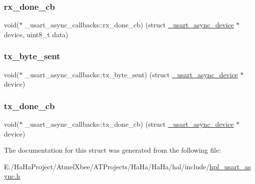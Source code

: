 \mbox{\label{struct__usart__async__callbacks_af3670aee54cc400737048dde5c64d30e}} 
\subsubsection{\texorpdfstring{rx\+\_\+done\+\_\+cb}{rx\_done\_cb}}
{\footnotesize\ttfamily void($\ast$ \+\_\+usart\+\_\+async\+\_\+callbacks\+::rx\+\_\+done\+\_\+cb) (struct \hyperlink{struct__usart__async__device}{\+\_\+usart\+\_\+async\+\_\+device} $\ast$device, uint8\+\_\+t data)}

\mbox{\label{struct__usart__async__callbacks_a8213240efd24edc2266b1d499b42e945}} 
\subsubsection{\texorpdfstring{tx\+\_\+byte\+\_\+sent}{tx\_byte\_sent}}
{\footnotesize\ttfamily void($\ast$ \+\_\+usart\+\_\+async\+\_\+callbacks\+::tx\+\_\+byte\+\_\+sent) (struct \hyperlink{struct__usart__async__device}{\+\_\+usart\+\_\+async\+\_\+device} $\ast$device)}

\mbox{\label{struct__usart__async__callbacks_a71fe195e0159ee0b107df69b2b02f619}} 
\subsubsection{\texorpdfstring{tx\+\_\+done\+\_\+cb}{tx\_done\_cb}}
{\footnotesize\ttfamily void($\ast$ \+\_\+usart\+\_\+async\+\_\+callbacks\+::tx\+\_\+done\+\_\+cb) (struct \hyperlink{struct__usart__async__device}{\+\_\+usart\+\_\+async\+\_\+device} $\ast$device)}



The documentation for this struct was generated from the following file\+:\begin{DoxyCompactItemize}
\item 
E\+:/\+Ha\+Ha\+Project/\+Atmel\+Xbee/\+A\+T\+Projects/\+Ha\+Ha/\+Ha\+Ha/hal/include/\hyperlink{hpl__usart__async_8h}{hpl\+\_\+usart\+\_\+async.\+h}\end{DoxyCompactItemize}
